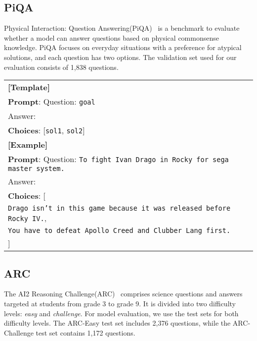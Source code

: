 \subsection{PiQA}

Physical Interaction: Question Answering(PiQA)~\cite{bisk2020piqa} is a benchmark to evaluate whether a model can answer questions based on physical commonsense knowledge. PiQA focuses on everyday situations with a preference for atypical solutions, and each question has two options. The validation set used for our evaluation consists of 1,838 questions.

\begin{table}[H]
\centering
\begin{small}
\begin{tabular}{|p{7cm}|}
\hline
\textbf{[Template]} \\
\textbf{Prompt}: Question: \texttt{goal}\\Answer: \\
\textbf{Choices}: [\texttt{sol1}, \texttt{sol2}] \\ 
\hline \textbf{[Example]} \\
\textbf{Prompt}: Question: \texttt{To fight Ivan Drago in Rocky for sega master system.} \\Answer:\\
\textbf{Choices}: [ \\
\hspace*{2em}\texttt{Drago isn't in this game because it was released before Rocky IV.}, \\
\hspace*{2em}\texttt{You have to defeat Apollo Creed and Clubber Lang first.} \\
] \\ \hline
\end{tabular}
\end{small}
\end{table}

\subsection{ARC}

The AI2 Reasoning Challenge(ARC)~\cite{clark2018think} comprises science questions and answers targeted at students from grade 3 to grade 9. It is divided into two difficulty levels: \textit{easy} and \textit{challenge}. For model evaluation, we use the test sets for both difficulty levels. The ARC-Easy test set includes 2,376 questions, while the ARC-Challenge test set contains 1,172 questions.

